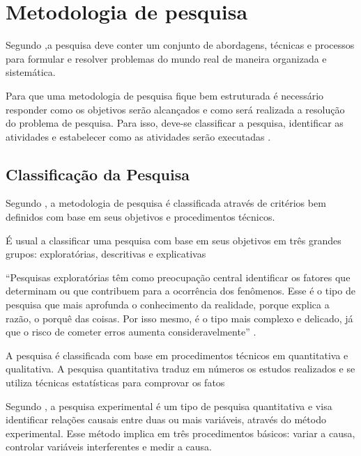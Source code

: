 \chapter{Metodologia de pesquisa}

Segundo ,a pesquisa deve conter um conjunto de abordagens, técnicas e processos para formular e resolver problemas do mundo real de maneira organizada e sistemática.

Para que uma metodologia de pesquisa fique bem estruturada é necessário responder como os objetivos serão alcançados e  como será realizada a resolução do problema de pesquisa. Para isso, deve-se classificar a pesquisa, identificar as atividades e estabelecer como as atividades serão executadas \cite{forcon2014}.

\section{Classificação da Pesquisa}

Segundo , a metodologia de pesquisa é classificada através de critérios bem definidos com base em seus objetivos e procedimentos técnicos.

 É usual a classificar uma pesquisa com base em seus objetivos em três grandes grupos: exploratórias, descritivas e explicativas \cite[pág.~41]{gil2008}

\begin{citacao}
“Pesquisas exploratórias têm como preocupação central identificar os fatores que determinam ou que contribuem para a ocorrência dos fenômenos. Esse é o tipo de pesquisa que mais aprofunda o conhecimento da realidade, porque explica a razão, o porquê das coisas. Por isso mesmo, é o tipo mais complexo e delicado, já que o risco de cometer erros aumenta consideravelmente” \cite[pág.~43]{gil2008}.
\end{citacao}

A pesquisa é classificada com base em procedimentos técnicos em quantitativa e qualitativa. A pesquisa quantitativa traduz em números os estudos realizados e se utiliza técnicas estatísticas para comprovar os fatos \cite[pág.~9]{rodrigues2007}

Segundo \cite[pág.~2]{bandeira2012}, a pesquisa experimental é um tipo de pesquisa quantitativa e visa identificar relações causais entre duas ou mais variáveis, através do método experimental. Esse método implica em três procedimentos básicos: variar a causa, controlar variáveis interferentes e medir a causa.

